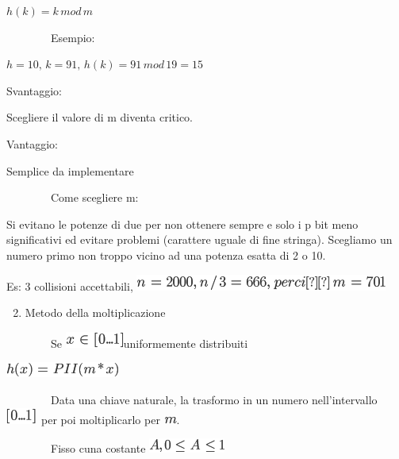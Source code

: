 \documentclass{article}
\providecommand{\tightlist}{%
  \setlength{\itemsep}{0pt}\setlength{\parskip}{0pt}}
\begin{document}
{$h(k) = k\,mod\,m$

{~~~~~~~~Esempio: }

$h=10,\,k=91,\,h(k)=91\,mod\,19=15$

{}

{Svantaggio: }

{Scegliere il valore di m diventa critico. }

{}

{Vantaggio:}

{Semplice da implementare}

{}

{~~~~~~~~Come scegliere m:}

{Si evitano le potenze di due per non ottenere sempre e solo i p bit
meno significativi ed evitare problemi (carattere uguale di fine
stringa). Scegliamo un numero primo non troppo vicino ad una potenza
esatta di 2 o 10.}

{Es: 3 collisioni accettabili, }\includegraphics{images/image257.png}

{}

{}

\begin{enumerate}
\setcounter{enumi}{1}
\tightlist
\item
  {Metodo della moltiplicazione}
\end{enumerate}

{}

{~~~~~~~~Se }\includegraphics{images/image258.png}{uniformemente
distribuiti}

\includegraphics{images/image259.png}

{}

{~~~~~~~~Data una chiave naturale, la trasformo in un numero
nell'intervallo }\includegraphics{images/image260.png}{~per poi
moltiplicarlo per }\includegraphics{images/image235.png}{.}

{~~~~~~~~Fisso cuna costante }\includegraphics{images/image261.png}

}
\end{document}

